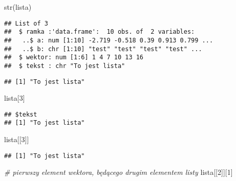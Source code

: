 \documentclass[
]{book}
\newenvironment{Shaded}{\begin{snugshade}}{\end{snugshade}}
\newcommand{\CommentTok}[1]{\textcolor[rgb]{0.56,0.35,0.01}{\textit{#1}}}
\newcommand{\DecValTok}[1]{\textcolor[rgb]{0.00,0.00,0.81}{#1}}
\newcommand{\FunctionTok}[1]{\textcolor[rgb]{0.00,0.00,0.00}{#1}}
\newcommand{\NormalTok}[1]{#1}
\newcommand{\SpecialCharTok}[1]{\textcolor[rgb]{0.00,0.00,0.00}{#1}}
\begin{document}
\begin{Shaded}
\begin{Highlighting}[]
\FunctionTok{str}\NormalTok{(lista)}
\end{Highlighting}
\end{Shaded}

\begin{verbatim}
## List of 3
##  $ ramka :'data.frame':  10 obs. of  2 variables:
##   ..$ a: num [1:10] -2.719 -0.518 0.39 0.913 0.799 ...
##   ..$ b: chr [1:10] "test" "test" "test" "test" ...
##  $ wektor: num [1:6] 1 4 7 10 13 16
##  $ tekst : chr "To jest lista"
\end{verbatim}

\begin{Shaded}
\end{Shaded}

\begin{verbatim}
## [1] "To jest lista"
\end{verbatim}

\begin{Shaded}
\begin{Highlighting}[]
\NormalTok{lista[}\DecValTok{3}\NormalTok{]}
\end{Highlighting}
\end{Shaded}

\begin{verbatim}
## $tekst
## [1] "To jest lista"
\end{verbatim}

\begin{Shaded}
\begin{Highlighting}[]
\NormalTok{lista[[}\DecValTok{3}\NormalTok{]]}
\end{Highlighting}
\end{Shaded}

\begin{verbatim}
## [1] "To jest lista"
\end{verbatim}

\begin{Shaded}
\begin{Highlighting}[]
\CommentTok{\# pierwszy element wektora, będącego drugim elementem listy}
\NormalTok{lista[[}\DecValTok{2}\NormalTok{]][}\DecValTok{1}\NormalTok{]}
\end{Highlighting}
\end{Shaded}
\end{document}
